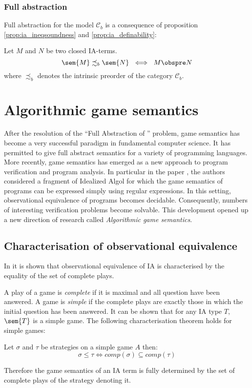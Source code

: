 \subsubsection{Full abstraction}

Full abstraction for the model $\mathcal{C}_b$ is a consequence of proposition
\ref{prop:ia_ineqsoundness} and \ref{prop:ia_definability}:
\begin{theorem}
Let $M$ and $N$ be two closed IA-terms.
$$\sem{M} \precsim_b \sem{N} \ \iff \ M \obspre N$$
where $\precsim_b$ denotes the intrinsic preorder of the category
$\mathcal{C}_b$.
\end{theorem}


\section{Algorithmic game semantics}

After the resolution of the ``Full Abstraction of \pcf'' problem, game semantics has become a very successful paradigm in fundamental computer science. It has permitted to give full abstract semantics for a variety of programming languages. More recently, game semantics has emerged as a new approach to program verification and program analysis. In particular in the paper \cite{ghicamccusker00}, the authors considered a fragment of Idealized Algol for which the game semantics of programs can be expressed simply using regular expressions. In this setting, observational equivalence of programs becomes decidable. Consequently, numbers of interesting verification problems become solvable. This development opened up a new direction
of research called \emph{Algorithmic game semantics}.

\subsection{Characterisation of observational equivalence}

In \citep{AM97a} it is shown that observational equivalence of IA is characterised by the equality of the set of complete plays.

A play of a game is \emph{complete} if it is maximal and all
question have been answered. A game is \emph{simple} if the complete plays are exactly those in which the initial question has been answered. It can be shown that for any IA type $T$, $\sem{T}$ is a simple game. The following characterisation theorem holds for simple games:
\begin{theorem}
Let $\sigma$ and $\tau$ be strategies on a simple game $A$ then:
$$\sigma \leq \tau \iff \textit{comp}(\sigma) \subseteq \textit{comp}(\tau)$$
\end{theorem}
Therefore the game semantics of an IA term is fully determined by the set of complete plays of the strategy denoting it.

